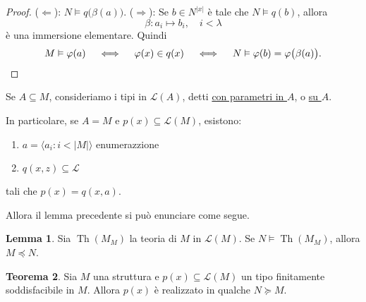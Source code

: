 \documentclass[10pt]{article}
\newcommand{\card}[1]{\left\vert #1 \right\vert}
\newcommand{\1}{\mathds{1}}
\theoremstyle{definition}%
\newtheorem{thm}{Teorema}[section]
\newtheorem{lem}[thm]{Lemma}
\theoremstyle{plain}
\theoremstyle{remark}
\begin{document}
\begin{proof}
(\(\Leftarrow\)): \(N\vDash q\big(\beta(a)\big)\).
(\(\Rightarrow\)): Se \(b \in N^{|x|}\) è tale che \(N\vDash q(b)\), allora
\begin{equation*}
\beta:a_{i}\mapsto b_{i},\quad i<\lambda
\end{equation*}
è una immersione elementare. Quindi
\begin{equation*}
M\vDash \varphi(a)\quad\iff\quad \varphi(x) \in q(x)\quad \iff \quad N\vDash \varphi(b) = \varphi\big(\beta(a)\big).\qedhere
\end{equation*}
\end{proof}

Se \(A \subseteq M\), consideriamo i tipi in \(\mathcal{L}(A)\), detti \uline{con parametri in \(A\)}, o \uline{su \(A\)}.

In particolare, se \(A=M\) e \(p(x) \subseteq \mathcal{L}(M)\), esistono:
\begin{enumerate}
\item \(a=\langle a_{i}:i<\card{M}\rangle\) enumerazzione
\item \(q(x,z) \subseteq \mathcal{L}\)
\end{enumerate}
tali che \(p(x) = q(x,a)\).

Allora il lemma precedente si può enunciare come segue.
\begin{lem}
Sia \(\operatorname{Th}(M_{M})\) la teoria di \(M\) in \(\mathcal{L}(M)\). Se \(N\vDash\operatorname{Th}(M_{M})\), allora \(M\preceq N\).
\end{lem}
\begin{thm}
Sia \(M\) una struttura e \(p(x) \subseteq \mathcal{L}(M)\) un tipo finitamente soddisfacibile in \(M\). Allora \(p(x)\) è realizzato in qualche \(N\succeq M\).
\label{thm:realtipifinsodd}
\end{thm}
\end{document}
